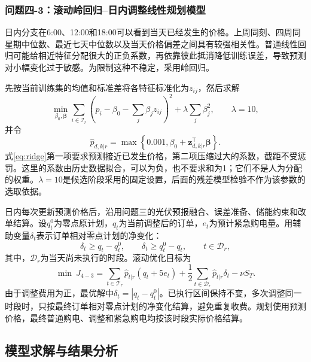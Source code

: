 \documentclass[11pt,a4paper]{article}
\begin{document}
\subsubsection{问题四-3：滚动岭回归--日内调整线性规划模型}

日内分支在6:00、12:00和18:00可以看到当天已经发生的价格。上周同刻、四周同星期中位数、最近七天中位数以及当天价格偏差之间具有较强相关性。普通线性回归可能给相近特征分配很大的正负系数，再依靠彼此抵消降低训练误差，导致预测对小幅变化过于敏感。为限制这种不稳定，采用岭回归。

先按当前训练集的均值和标准差将各特征标准化为$z_{ij}$，然后求解
\begin{equation}
 \min_{\beta_0,\boldsymbol\beta}
 \sum_{i\in\mathcal I_r}\left(p_i-\beta_0-\sum_j\beta_jz_{ij}\right)^2
 +\lambda\sum_j\beta_j^2,
 \qquad \lambda=10,
 \label{eq:ridge}
\end{equation}
并令
\begin{equation}
 \widehat p_{d,k|r}=\max\left\{0.001,\beta_0+
 \boldsymbol z_{d,k|r}^{\mathsf T}\boldsymbol\beta\right\}.
 \label{eq:ridgepredict}
\end{equation}
式\eqref{eq:ridge}第一项要求预测接近已发生价格，第二项压缩过大的系数，截距不受惩罚。这里的系数由历史数据拟合，可以为负，也不要求和为1；它们不是人为分配的权重。$\lambda=10$是候选阶段采用的固定设置，后面的残差模型检验不作为该参数的选取依据。

日内每次更新预测价格后，沿用问题三的光伏预报融合、误差准备、储能约束和改单结算。设$q_t^0$为零点原计划，$q_t$为当前调整后的订单，$e_t$为预计紧急购电量。用辅助变量$\delta_t$表示订单相对零点计划的净变化：
\begin{equation}
 \delta_t\ge q_t-q_t^0,\qquad \delta_t\ge q_t^0-q_t,
 \qquad t\in\mathcal D_r,
 \label{eq:delta}
\end{equation}
其中，$\mathcal D_r$为当天尚未执行的时段。滚动优化目标为
\begin{equation}
 \min\ J_{4-3}=\sum_{t\in\mathcal T_r}\widehat p_{t|r}(q_t+5e_t)
 +\frac12\sum_{t\in\mathcal D_r}\widehat p_{t|r}\delta_t-\nu S_T.
 \label{eq:q43lp}
\end{equation}
由于调整费用为正，最优解中$\delta_t=|q_t-q_t^0|$。已执行区间保持不变，多次调整同一时段时，只按最终订单相对零点计划的净变化结算，避免重复收费。规划使用预测价格，最终普通购电、调整和紧急购电均按该时段实际价格结算。

\subsection{模型求解与结果分析}
\end{document}
